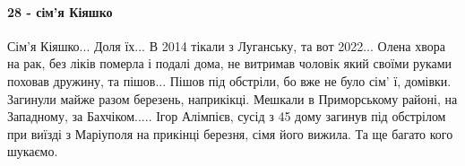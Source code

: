  
 
 
 
 

\paragraph{28 - сім'я Кіяшко}

\raggedcolumns
\begin{multicols}{2} %
\setlength{\parindent}{0pt}

\begin{itemize} %

Сім'я Кіяшко... Доля їх... В 2014 тікали з Луганську, та вот 2022... Олена хвора
на рак, без ліків померла і подалі дома, не витримав чоловік який своїми руками
поховав дружину, та пішов... Пішов під обстріли, бо вже не було сім' ї,
домівки. Загинули майже разом березень, наприкікці. Мешкали в Приморському
районі, на Западному, за Бахчіком..... Ігор Алімпієв, сусід з 45 дому загинув
під обстрілом при виїзді з Маріуполя на прикінці березня, сімя його вижила. Та
ще багато кого шукаємо.

\end{itemize} %

\end{multicols} %
